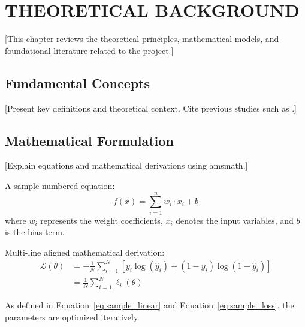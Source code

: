 \chapter{THEORETICAL BACKGROUND}
\label{chap:theory}

[This chapter reviews the theoretical principles, mathematical models, and foundational literature related to the project.]

\section{Fundamental Concepts}
\label{sec:concepts}

[Present key definitions and theoretical context. Cite previous studies such as \cite{sample_conference, sample_standard}.]

\section{Mathematical Formulation}
\label{sec:math}

[Explain equations and mathematical derivations using amsmath.]

A sample numbered equation:
\begin{equation}
    f(x) = \sum_{i=1}^{n} w_i \cdot x_i + b
    \label{eq:sample_linear}
\end{equation}
where $w_i$ represents the weight coefficients, $x_i$ denotes the input variables, and $b$ is the bias term.

Multi-line aligned mathematical derivation:
\begin{equation}
\begin{aligned}
    \mathcal{L}(\theta) &= -\frac{1}{N} \sum_{i=1}^{N} \left[ y_i \log(\hat{y}_i) + (1 - y_i) \log(1 - \hat{y}_i) \right] \\
    &= \frac{1}{N} \sum_{i=1}^{N} \ell_i(\theta)
\end{aligned}
\label{eq:sample_loss}
\end{equation}

As defined in Equation~\eqref{eq:sample_linear} and Equation~\eqref{eq:sample_loss}, the parameters are optimized iteratively.
